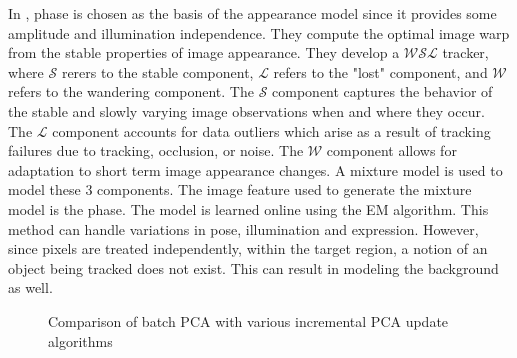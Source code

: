 In \cite{2003_JNL_TRKsubspace_Jepson}, phase is chosen as the basis of the appearance model since it provides some amplitude and illumination independence.  They compute the optimal image warp from the stable properties of image appearance.  They develop a $\mathcal{WSL}$ tracker, where $\mathcal{S}$ rerers to the stable component, $\mathcal{L}$ refers to the "lost" component, and $\mathcal{W}$ refers to the wandering component.  The $\mathcal{S}$ component captures the behavior of the stable and slowly varying image observations when and where they occur.  The $\mathcal{L}$ component accounts for data outliers which arise as a result of tracking failures due to tracking, occlusion, or noise.  The $\mathcal{W}$ component allows for adaptation to short term image appearance changes.  A mixture model is used to model these 3 components.  The image feature used to generate the mixture model is the phase.  The model is learned online using the EM algorithm.  This method can handle variations in pose, illumination and expression.  However, since pixels are treated independently, within the target region, a notion of an object being tracked does not exist.  This can result in modeling the background as well. 

								\begin{figure}[t]
								\centering	
								\caption{Comparison of batch PCA with various incremental PCA update algorithms \cite{2008_JNL_TRKsubs_Skocaj}}
								\label{fig:2008_JNL_TRKsub_Skocaj}				
								\end{figure}

